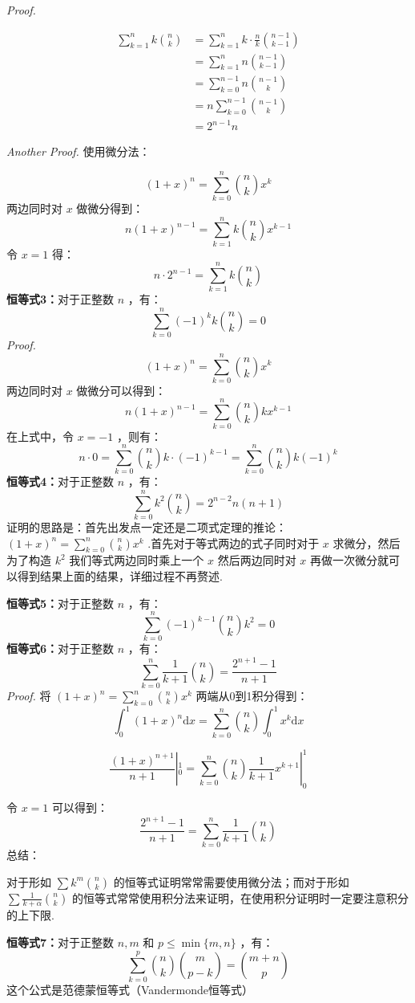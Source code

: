 \documentclass[cn, hazy, blue, normal, 12pt]{elegantnote}
\begin{document}
\textit{Proof.}

$$
    \begin{split}
        \sum_{k=1}^n k\binom{n}{k} &= \sum_{k=1}^n k\cdot \frac{n}{k}\binom{n-1}{k-1}\\
        &= \sum_{k=1}^n n \binom{n-1}{k-1}\\
        &= \sum_{k=0}^{n-1} n \binom{n-1}{k}\\
        &= n\sum_{k=0}^{n-1} \binom{n-1}{k}\\
        &= 2^{n-1} n
    \end{split}
$$

\textit{Another Proof.} 使用微分法：

$$
    (1+x)^n =\sum_{k=0}^{n} \binom{n}{k} x^k
$$
两边同时对 $ x $ 做微分得到：
$$
    n(1+x)^{n-1} = \sum_{k=1}^n k \binom{n}{k}x^{k-1}
$$
令 $ x=1 $ 得：
$$
    n\cdot 2^{n-1}=\sum_{k=1}^n k\binom{n}{k}
$$
\textbf{恒等式3：}对于正整数 $ n $ ，有：
$$
    \sum_{k=0}^n(-1)^k k\binom{n}{k}=0
$$
\textit{Proof.}
$$
    (1+x)^n=\sum_{k=0}^n \binom{n}{k}x^k
$$
两边同时对 $ x $ 做微分可以得到：
$$
    n(1+x)^{n-1}=\sum_{k=0}^n \binom{n}{k} k x^{k-1}
$$
在上式中，令 $ x=-1 $ ，则有：
$$
    n\cdot 0 =\sum_{k=0}^n\binom{n}{k}k \cdot (-1)^{k-1}=\sum_{k=0}^n\binom{n}{k} k(-1)^k
$$
\textbf{恒等式4：}对于正整数 $ n $ ，有：
$$
    \sum_{k=0}^n k^2 \binom{n}{k}=2^{n-2}n(n+1)
$$
证明的思路是：首先出发点一定还是二项式定理的推论： $ (1+x)^n=\sum_{k=0}^n \binom{n}{k}x^k $ .首先对于等式两边的式子同时对于 $ x $ 求微分，然后为了构造 $ k^2 $ 我们等式两边同时乘上一个 $ x $ 然后两边同时对 $ x $ 再做一次微分就可以得到结果上面的结果，详细过程不再赘述.

\textbf{恒等式5：}对于正整数 $ n $ ，有：
$$
    \sum_{k=0}^n (-1)^{k-1}\binom{n}{k} k^2=0
$$
\textbf{恒等式6：}对于正整数 $ n $ ，有：
$$
    \sum_{k=0}^n \frac{1}{k+1}\binom{n}{k}=\frac{2^{n+1}-1}{n+1}
$$
\textit{Proof.} 将 $ (1+x)^n=\sum_{k=0}^n\binom{n}{k}x^k $ 两端从0到1积分得到：
$$
    \int_0^1(1+x)^n\mathrm{d}x = \sum_{k=0}^n\binom{n}{k}\int_0^1x^k\mathrm{d}x
$$

$$
    \frac{(1+x)^{n+1}}{n+1}|_0^1=\sum_{k=0}^n\binom{n}{k}\frac{1}{k+1}x^{k+1}|_0^1
$$

令 $ x=1 $ 可以得到：
$$
    \frac{2^{n+1}-1}{n+1}=\sum_{k=0}^n \frac{1}{k+1}\binom{n}{k}
$$
总结：

对于形如 $ \sum k^m\binom{n}{k} $ 的恒等式证明常常需要使用微分法；而对于形如 $ \sum\frac{1}{k+\alpha}\binom{n}{k} $ 的恒等式常常使用积分法来证明，在使用积分证明时一定要注意积分的上下限.

\textbf{恒等式7：}对于正整数 $ n,m $ 和 $ p\leq \min\{m,n\} $ ，有：
$$
    \sum_{k=0}^p\binom{n}{k}\binom{m}{p-k}=\binom{m+n}{p}
$$
这个公式是范德蒙恒等式（Vandermonde恒等式）
\end{document}
